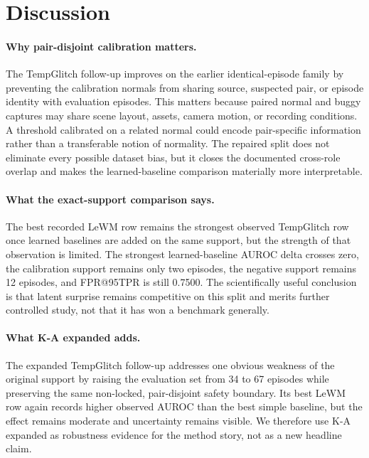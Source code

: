 \section{Discussion}
\label{sec:discussion}

\paragraph{Why pair-disjoint calibration matters.}
The TempGlitch follow-up improves on the earlier identical-episode family by preventing the
calibration normals from sharing source, suspected pair, or episode identity with evaluation
episodes. This matters because paired normal and buggy captures may share scene layout, assets,
camera motion, or recording conditions. A threshold calibrated on a related normal could encode
pair-specific information rather than a transferable notion of normality. The repaired split does
not eliminate every possible dataset bias, but it closes the documented cross-role overlap and
makes the learned-baseline comparison materially more interpretable.

\paragraph{What the exact-support comparison says.}
The best recorded LeWM row remains the strongest observed TempGlitch row once learned baselines are
added on the same support, but the strength of that observation is limited. The strongest
learned-baseline AUROC delta crosses zero, the calibration support remains only two episodes, the
negative support remains 12 episodes, and FPR@95TPR is still 0.7500. The scientifically useful
conclusion is that latent surprise remains competitive on this split and merits further controlled
study, not that it has won a benchmark generally.

\paragraph{What K-A expanded adds.}
The expanded TempGlitch follow-up addresses one obvious weakness of the original support by
raising the evaluation set from 34 to 67 episodes while preserving the same non-locked,
pair-disjoint safety boundary. Its best LeWM row again records higher observed AUROC than the best
simple baseline, but the effect remains moderate and uncertainty remains visible. We therefore use
K-A expanded as robustness evidence for the method story, not as a new headline claim.

